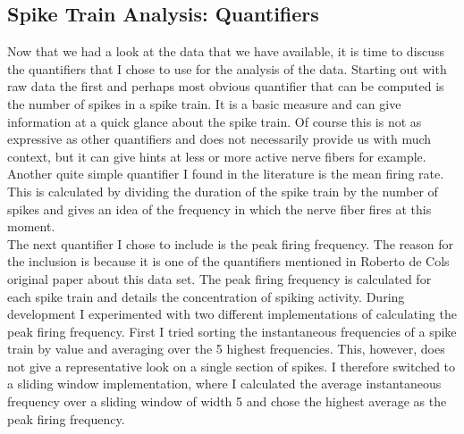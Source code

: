 \subsection{Spike Train Analysis: Quantifiers}
Now that we had a look at the data that we have available, it is time to discuss the quantifiers that I chose to use for the analysis of the data.
Starting out with raw data the first and perhaps most obvious quantifier that can be computed is the number of spikes in a spike train. It is a basic measure and can give information at a quick glance about the spike train. Of course this is not as expressive as other quantifiers and does not necessarily provide us with much context, but it can give hints at less or more active nerve fibers for example. \\
Another quite simple quantifier I found in the literature is the mean firing rate. This is calculated by dividing the duration of the spike train by the number of spikes and gives an idea of the frequency in which the nerve fiber fires at this moment.\\
The next quantifier I chose to include is the peak firing frequency. The reason for the inclusion is because it is one of the quantifiers mentioned in Roberto de Cols original paper about this data set. The peak firing frequency is calculated for each spike train and details the concentration of spiking activity. During development I experimented with two different implementations of calculating the peak firing frequency. First I tried sorting the instantaneous frequencies of a spike train by value and averaging over the 5 highest frequencies. This, however, does not give a representative look on a single section of spikes. I therefore switched to a sliding window implementation, where I calculated the average instantaneous frequency over a sliding window of width 5 and chose the highest average as the peak firing frequency.\\
\begin{comment}
At the request of my advisor I calculated the inter spike intervals(ISI) for the spike trains. This can give us a measure of the distribution of spikes in a spike train.\\
Going off of the ISI we can compute the linearity of the inter spike intervals in the form of R2. We want to know if the ISIs tend to increase as the spike trains last longer or decrease or if there is no significant impact. From the start we suspected that the intervals increase as the spike train goes on and calculating the R2 value should give us the confirmation.
\end{comment}



\cleardoublepage
